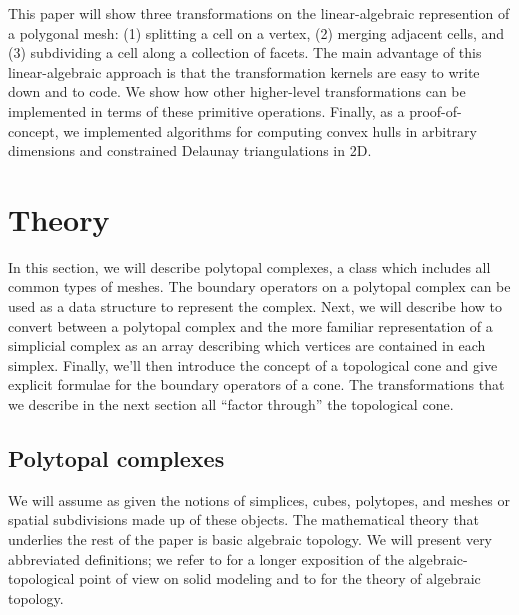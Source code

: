 \documentclass[twocolumn]{article}
\begin{document}
This paper will show three transformations on the linear-algebraic represention of a polygonal mesh: (1) splitting a cell on a vertex, (2) merging adjacent cells, and (3) subdividing a cell along a collection of facets.
The main advantage of this linear-algebraic approach is that the transformation kernels are easy to write down and to code.
We show how other higher-level transformations can be implemented in terms of these primitive operations.
Finally, as a proof-of-concept, we implemented algorithms for computing convex hulls in arbitrary dimensions and constrained Delaunay triangulations in 2D.


\section{Theory}

In this section, we will describe polytopal complexes, a class which includes all common types of meshes.
The boundary operators on a polytopal complex can be used as a data structure to represent the complex.
Next, we will describe how to convert between a polytopal complex and the more familiar representation of a simplicial complex as an array describing which vertices are contained in each simplex.
Finally, we'll then introduce the concept of a topological cone and give explicit formulae for the boundary operators of a cone.
The transformations that we describe in the next section all ``factor through'' the topological cone.

\subsection{Polytopal complexes}

We will assume as given the notions of simplices, cubes, polytopes, and meshes or spatial subdivisions made up of these objects.
The mathematical theory that underlies the rest of the paper is basic algebraic topology.
We will present very abbreviated definitions; we refer to \cite{dicarlo2007solid} for a longer exposition of the algebraic-topological point of view on solid modeling and to \cite{hatcher2002algebraic} for the theory of algebraic topology.
\end{document}
